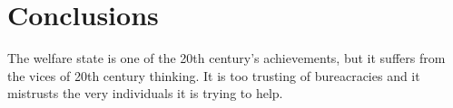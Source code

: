 \chapter{Conclusions}

The welfare state is one of the 20th century's achievements, but it suffers
from the vices of 20th century thinking. It is too trusting of bureacracies and
it mistrusts the very individuals it is trying to help.



